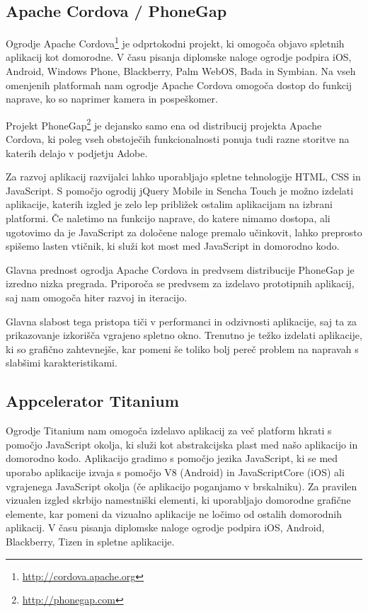 \subsection{Apache Cordova / PhoneGap}

Ogrodje Apache Cordova\footnote{\href{http://cordova.apache.org}{http://cordova.apache.org}} je odprtokodni projekt, ki omogoča objavo spletnih aplikacij kot domorodne. V času pisanja diplomske naloge ogrodje podpira iOS, Android, Windows Phone, Blackberry, Palm WebOS, Bada in Symbian. Na vseh omenjenih platformah nam ogrodje Apache Cordova omogoča dostop do funkcij naprave, ko so naprimer kamera in pospeškomer. 

Projekt PhoneGap\footnote{\href{http://phonegap.com}{http://phonegap.com}} je dejansko samo ena od distribucij projekta Apache Cordova, ki poleg vseh obstoječih funkcionalnosti ponuja tudi razne storitve na katerih delajo v podjetju Adobe.

Za razvoj aplikacij razvijalci lahko uporabljajo spletne tehnologije HTML, CSS in JavaScript. S pomočjo ogrodij jQuery Mobile in Sencha Touch je možno izdelati aplikacije, katerih izgled je zelo lep približek ostalim aplikacijam na izbrani platformi. Če naletimo na funkcijo naprave, do katere nimamo dostopa, ali ugotovimo da je JavaScript za določene naloge premalo učinkovit, lahko preprosto spišemo lasten vtičnik, ki služi kot most med JavaScript in domorodno kodo.

Glavna prednost ogrodja Apache Cordova in predvsem distribucije PhoneGap je izredno nizka pregrada. Priporoča se predvsem za izdelavo prototipnih aplikacij, saj nam omogoča hiter razvoj in iteracijo.

Glavna slabost tega pristopa tiči v performanci in odzivnosti aplikacije, saj ta za prikazovanje izkorišča vgrajeno spletno okno. Trenutno je težko izdelati aplikacije, ki so grafično zahtevnejše, kar pomeni še toliko bolj pereč problem na napravah s slabšimi karakteristikami.

\subsection{Appcelerator Titanium}

Ogrodje Titanium nam omogoča izdelavo aplikacij za več platform hkrati s pomočjo JavaScript okolja, ki služi kot abstrakcijska plast med našo aplikacijo in domorodno kodo. Aplikacijo gradimo s pomočjo jezika JavaScript, ki se med uporabo aplikacije izvaja s pomočjo V8 (Android) in JavaScriptCore (iOS) ali vgrajenega JavaScript okolja (če aplikacijo poganjamo v brskalniku). Za pravilen vizualen izgled skrbijo namestniški elementi, ki uporabljajo domorodne grafične elemente, kar pomeni da vizualno aplikacije ne ločimo od ostalih domorodnih aplikacij. V času pisanja diplomske naloge ogrodje podpira iOS, Android, Blackberry, Tizen in spletne aplikacije.

